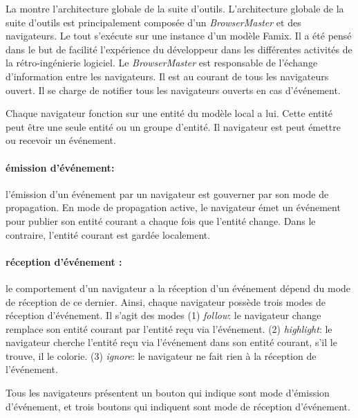 \documentclass[a4paper]{article}
\newcommand{\browserMaster}{\textit{BrowserMaster} \xspace}
\begin{document}
La  montre l'architecture globale de la suite d'outils.
L'architecture globale de la suite d'outils est principalement composée d'un \browserMaster et des navigateurs.
Le tout s'exécute sur une instance d'un modèle Famix. 
Il a été pensé dans le but de facilité l'expérience du développeur dans les différentes activités de la rétro-ingénierie logiciel.
Le \browserMaster est responsable de l'échange d'information entre les navigateurs.
Il est au courant de tous les navigateurs ouvert. 
Il se charge de notifier tous les navigateurs ouverts en cas d'événement.

Chaque navigateur fonction sur une entité du modèle  local a lui.
Cette entité peut être une seule entité ou un groupe d'entité.
Il navigateur est peut émettre ou recevoir un événement. 
\paragraph{émission d'événement:} l'émission d'un événement par un navigateur est gouverner par son mode de propagation.
En mode de propagation active, le navigateur émet un événement pour publier son entité courant a chaque fois que l'entité change.
Dans le contraire, l'entité courant est gardée localement.

\paragraph{réception d'événement : } le comportement d'un navigateur a la réception d'un événement dépend du mode de réception de ce dernier.
Ainsi, chaque navigateur possède trois modes de réception d'événement. 
Il s'agit des modes (1) \textit{follow}: le navigateur change remplace son entité courant par l'entité reçu via l'événement.
(2) \textit{highlight}: le navigateur cherche l'entité reçu via l'événement dans son entité courant, s'il le trouve, il le colorie.
(3) \textit{ignore}: le navigateur ne fait rien à la réception de l'événement.

Tous les navigateurs présentent un bouton qui indique sont mode d'émission d'événement, et trois boutons qui indiquent sont mode de réception d'événement.
\end{document}
